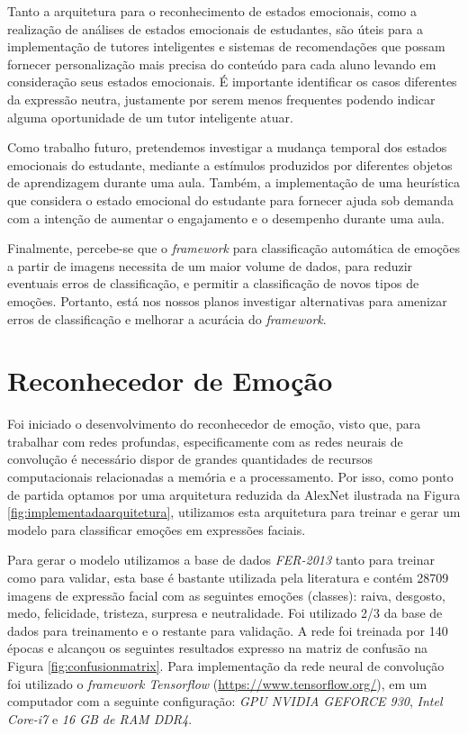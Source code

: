 Tanto a arquitetura para o reconhecimento de estados emocionais, como a
realização de análises de estados emocionais de estudantes, são úteis para a implementação de tutores inteligentes e sistemas de recomendações que possam fornecer personalização mais precisa do conteúdo para cada aluno levando em consideração seus estados emocionais. É importante identificar os casos diferentes da expressão neutra, justamente por serem menos frequentes podendo indicar alguma oportunidade de um tutor inteligente atuar.

Como trabalho futuro, pretendemos investigar a mudança temporal dos estados emocionais do estudante, mediante a estímulos produzidos por diferentes objetos de aprendizagem durante uma aula. Também, a implementação de uma heurística que considera o estado emocional do estudante para fornecer ajuda sob demanda com a intenção de aumentar o engajamento e o desempenho durante uma aula.

Finalmente, percebe-se que o \textit{framework} para classificação automática de emoções a partir de imagens necessita de um maior volume de dados, para reduzir eventuais erros de classificação, e permitir a classificação de novos tipos de emoções. Portanto, está nos nossos planos investigar alternativas para amenizar erros de classificação e melhorar a acurácia do \textit{framework}.

\section{Reconhecedor de Emoção}\label{sec:reconhecedor}


Foi iniciado o desenvolvimento do reconhecedor de emoção, visto que, para trabalhar com redes profundas, especificamente com as redes neurais de convolução é necessário dispor de grandes quantidades de recursos computacionais relacionadas a memória e a processamento. Por isso, como ponto de partida optamos por uma arquitetura reduzida da AlexNet ilustrada na Figura \ref{fig:implementadaarquitetura}, utilizamos esta arquitetura para treinar e gerar um modelo para classificar emoções em expressões faciais.

Para gerar o modelo utilizamos a base de dados \textit{FER-2013} tanto para treinar como para validar, esta base é bastante utilizada pela literatura e contém 28709 imagens de expressão facial com as seguintes emoções (classes): raiva, desgosto, medo, felicidade, tristeza, surpresa e neutralidade. Foi utilizado 2/3 da base de dados para treinamento e o restante para validação. A rede foi treinada por 140 épocas e alcançou os seguintes resultados expresso na matriz de confusão na Figura \ref{fig:confusionmatrix}. Para implementação da rede neural de convolução foi utilizado o \textit{framework Tensorflow} (\url{https://www.tensorflow.org/}), em um computador com a seguinte configuração: \textit{GPU NVIDIA GEFORCE 930}, \textit{Intel Core-i7} e \textit{16 GB de RAM DDR4}. 


